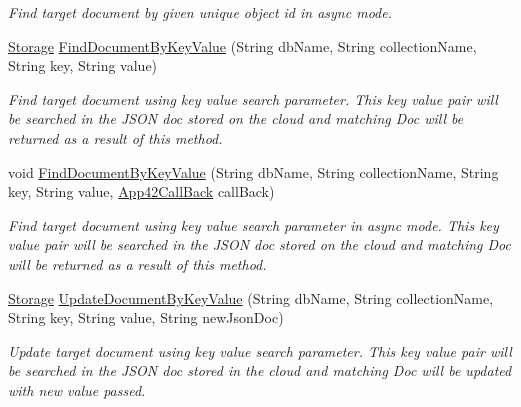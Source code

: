 \begin{DoxyCompactItemize}
\begin{DoxyCompactList}\small\item\em Find target document by given unique object id in async mode. \end{DoxyCompactList}\item 
\hyperlink{classcom_1_1shephertz_1_1app42_1_1paas_1_1sdk_1_1csharp_1_1storage_1_1_storage}{Storage} \hyperlink{classcom_1_1shephertz_1_1app42_1_1paas_1_1sdk_1_1csharp_1_1storage_1_1_storage_service_ab3b8b5292ae73df310965011ee4e9bbf}{Find\+Document\+By\+Key\+Value} (String db\+Name, String collection\+Name, String key, String value)
\begin{DoxyCompactList}\small\item\em Find target document using key value search parameter. This key value pair will be searched in the J\+S\+O\+N doc stored on the cloud and matching Doc will be returned as a result of this method. \end{DoxyCompactList}\item 
void \hyperlink{classcom_1_1shephertz_1_1app42_1_1paas_1_1sdk_1_1csharp_1_1storage_1_1_storage_service_afa1a1a365af47287c6582cf347529943}{Find\+Document\+By\+Key\+Value} (String db\+Name, String collection\+Name, String key, String value, \hyperlink{interfacecom_1_1shephertz_1_1app42_1_1paas_1_1sdk_1_1csharp_1_1_app42_call_back}{App42\+Call\+Back} call\+Back)
\begin{DoxyCompactList}\small\item\em Find target document using key value search parameter in async mode. This key value pair will be searched in the J\+S\+O\+N doc stored on the cloud and matching Doc will be returned as a result of this method. \end{DoxyCompactList}\item 
\hyperlink{classcom_1_1shephertz_1_1app42_1_1paas_1_1sdk_1_1csharp_1_1storage_1_1_storage}{Storage} \hyperlink{classcom_1_1shephertz_1_1app42_1_1paas_1_1sdk_1_1csharp_1_1storage_1_1_storage_service_a7f34bbea20510c0feec3a71bfdb79fa6}{Update\+Document\+By\+Key\+Value} (String db\+Name, String collection\+Name, String key, String value, String new\+Json\+Doc)
\begin{DoxyCompactList}\small\item\em Update target document using key value search parameter. This key value pair will be searched in the J\+S\+O\+N doc stored in the cloud and matching Doc will be updated with new value passed. \end{DoxyCompactList}\item 

\end{DoxyCompactItemize}
